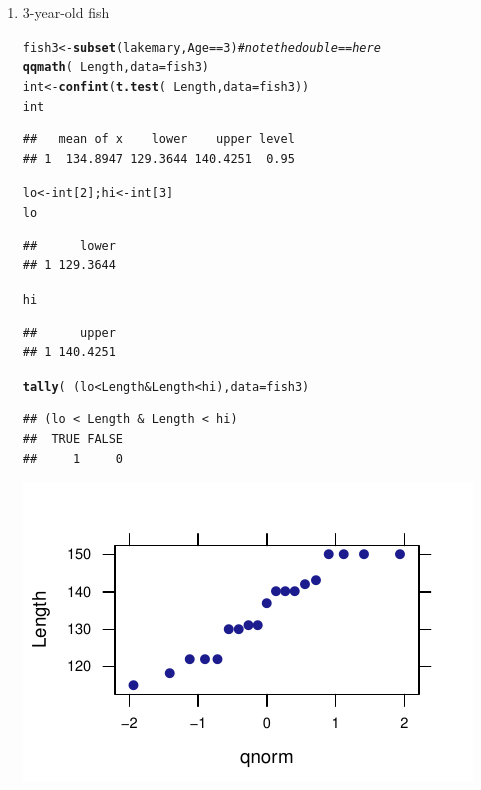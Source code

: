 \documentclass[twoside]{book}\usepackage[]{graphicx}\usepackage[]{xcolor}
\makeatletter
\def\maxwidth{ %
  \ifdim\Gin@nat@width>\linewidth
    \linewidth
  \else
    \Gin@nat@width
  \fi
}
\newcommand{\hlnum}[1]{\textcolor[rgb]{0.686,0.059,0.569}{#1}}%
\newcommand{\hlcom}[1]{\textcolor[rgb]{0.678,0.584,0.686}{\textit{#1}}}%
\newcommand{\hlopt}[1]{\textcolor[rgb]{0,0,0}{#1}}%
\newcommand{\hlstd}[1]{\textcolor[rgb]{0.345,0.345,0.345}{#1}}%
\newcommand{\hlkwb}[1]{\textcolor[rgb]{0.69,0.353,0.396}{#1}}%
\newcommand{\hlkwc}[1]{\textcolor[rgb]{0.333,0.667,0.333}{#1}}%
\newcommand{\hlkwd}[1]{\textcolor[rgb]{0.737,0.353,0.396}{\textbf{#1}}}%
\newenvironment{kframe}{%
 \def\at@end@of@kframe{}%
 \ifinner\ifhmode%
  \def\at@end@of@kframe{\end{minipage}}%
  \begin{minipage}{\columnwidth}%
 \fi\fi%
 \def\FrameCommand##1{\hskip\@totalleftmargin \hskip-\fboxsep
 \colorbox{shadecolor}{##1}\hskip-\fboxsep
     \hskip-\linewidth \hskip-\@totalleftmargin \hskip\columnwidth}%
 \MakeFramed {\advance\hsize-\width
   \@totalleftmargin\z@ \linewidth\hsize
   \@setminipage}}%
 {\par\unskip\endMakeFramed%
 \at@end@of@kframe}
\newenvironment{knitrout}{}{} %
\makeatother
\begin{document}
\begin{solution}
\begin{enumerate}
\item 3-year-old fish
\begin{knitrout}
\color{fgcolor}\begin{kframe}
\begin{alltt}
\hlstd{fish3} \hlkwb{<-} \hlkwd{subset}\hlstd{(lakemary, Age}\hlopt{==}\hlnum{3}\hlstd{)}  \hlcom{# note the double == here}
\hlkwd{qqmath}\hlstd{(}\hlopt{~}\hlstd{Length,} \hlkwc{data}\hlstd{=fish3)}
\hlstd{int} \hlkwb{<-} \hlkwd{confint}\hlstd{(}\hlkwd{t.test}\hlstd{(}\hlopt{~}\hlstd{Length,} \hlkwc{data}\hlstd{=fish3))}
\hlstd{int}
\end{alltt}
\begin{verbatim}
##   mean of x    lower    upper level
## 1  134.8947 129.3644 140.4251  0.95
\end{verbatim}
\begin{alltt}
\hlstd{lo} \hlkwb{<-} \hlstd{int[}\hlnum{2}\hlstd{]; hi} \hlkwb{<-} \hlstd{int[}\hlnum{3}\hlstd{]}
\hlstd{lo}
\end{alltt}
\begin{verbatim}
##      lower
## 1 129.3644
\end{verbatim}
\begin{alltt}
\hlstd{hi}
\end{alltt}
\begin{verbatim}
##      upper
## 1 140.4251
\end{verbatim}
\begin{alltt}
\hlkwd{tally} \hlstd{(} \hlopt{~} \hlstd{( lo} \hlopt{<} \hlstd{Length} \hlopt{&} \hlstd{Length} \hlopt{<} \hlstd{hi ),} \hlkwc{data}\hlstd{=fish3 )}
\end{alltt}
\begin{verbatim}
## (lo < Length & Length < hi)
##  TRUE FALSE 
##     1     0
\end{verbatim}
\end{kframe}

{\centering \includegraphics[width=\maxwidth]{figures/fig-unnamed-chunk-152-1} 

}
\end{knitrout}
\end{enumerate}
\end{solution}
\end{document}
